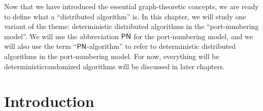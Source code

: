 

\noindent
Now that we have introduced the essential graph-theoretic concepts, we are ready to define what a ``distributed algorithm'' is. In this chapter, we will study one variant of the theme: deterministic distributed algorithms in the ``port-numbering model''. We will use the abbreviation $\textup{\sffamily PN}$ for the port-numbering model, and we will also use the term ``$\textup{\sffamily PN}$-algorithm'' to refer to deterministic distributed algorithms in the port-numbering model. For now, everything will be deterministic\mydash randomized algorithms will be discussed in later chapters.

\section{Introduction}

